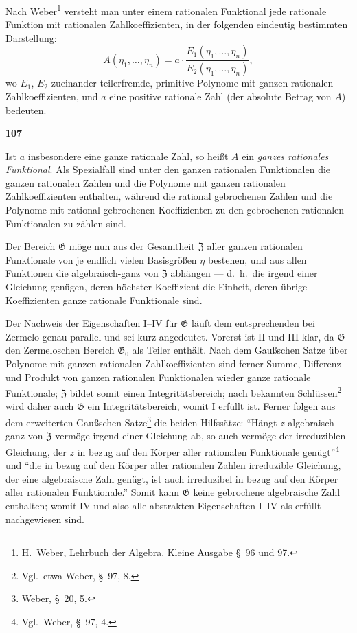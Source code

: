 \documentclass[12pt,a4paper]{article}
\begin{document}
Nach Weber\footnote{H.\ Weber, Lehrbuch der Algebra. Kleine Ausgabe \S\ 96 und 97.} versteht man unter einem rationalen Funktional jede rationale Funktion mit rationalen Zahlkoeffizienten, in der folgenden eindeutig bestimmten Darstellung:
\[A(\eta_1, \ldots, \eta_n) = a \cdot \frac{E_1(\eta_1, \ldots, \eta_n)}{E_2(\eta_1, \ldots, \eta_n)},\]
wo $E_1$, $E_2$ zueinander teilerfremde, primitive Polynome mit ganzen rationalen Zahlkoeffizienten, und $a$ eine positive rationale Zahl (der absolute Betrag von $A$) bedeuten.

\newpage
\begin{center}
\textbf{107}
\end{center}

Ist $a$ insbesondere eine ganze rationale Zahl, so hei\ss t $A$ ein \emph{ganzes rationales Funktional}. Als Spezialfall sind unter den ganzen rationalen Funktionalen die ganzen rationalen Zahlen und die Polynome mit ganzen rationalen Zahlkoeffizienten enthalten, w\"ahrend die rational gebrochenen Zahlen und die Polynome mit rational gebrochenen Koeffizienten zu den gebrochenen rationalen Funktionalen zu z\"ahlen sind.

Der Bereich $\mathfrak{G}$ m\"oge nun aus der Gesamtheit $\mathfrak{Z}$ aller ganzen rationalen Funktionale von je endlich vielen Basisgr\"o\ss en $\eta$ bestehen, und aus allen Funktionen die algebraisch-ganz von $\mathfrak{Z}$ abh\"angen --- d.\ h.\ die irgend einer Gleichung gen\"ugen, deren h\"ochster Koeffizient die Einheit, deren \"ubrige Koeffizienten ganze rationale Funktionale sind.

Der Nachweis der Eigenschaften I--IV f\"ur $\mathfrak{G}$ l\"auft dem entsprechenden bei Zermelo genau parallel und sei kurz angedeutet. Vorerst ist II und III klar, da $\mathfrak{G}$ den Zermeloschen Bereich $\mathfrak{G}_0$ als Teiler enth\"alt. Nach dem Gau\ss schen Satze \"uber Polynome mit ganzen rationalen Zahlkoeffizienten sind ferner Summe, Differenz und Produkt von ganzen rationalen Funktionalen wieder ganze rationale Funktionale; $\mathfrak{Z}$ bildet somit einen Integrit\"atsbereich; nach bekannten Schl\"ussen\footnote{Vgl.\ etwa Weber, \S\ 97, 8.} wird daher auch $\mathfrak{G}$ ein Integrit\"atsbereich, womit I erf\"ullt ist. Ferner folgen aus dem erweiterten Gau\ss schen Satze\footnote{Weber, \S\ 20, 5.} die beiden Hilfss\"atze: ``H\"angt $z$ algebraisch-ganz von $\mathfrak{Z}$ verm\"oge irgend einer Gleichung ab, so auch verm\"oge der irreduziblen Gleichung, der $z$ in bezug auf den K\"orper aller rationalen Funktionale gen\"ugt''\footnote{Vgl.\ Weber, \S\ 97, 4.} und ``die in bezug auf den K\"orper aller rationalen Zahlen irreduzible Gleichung, der eine algebraische Zahl gen\"ugt, ist auch irreduzibel in bezug auf den K\"orper aller rationalen Funktionale.'' Somit kann $\mathfrak{G}$ keine gebrochene algebraische Zahl enthalten; womit IV und also alle abstrakten Eigenschaften I--IV als erf\"ullt nachgewiesen sind.
\end{document}
